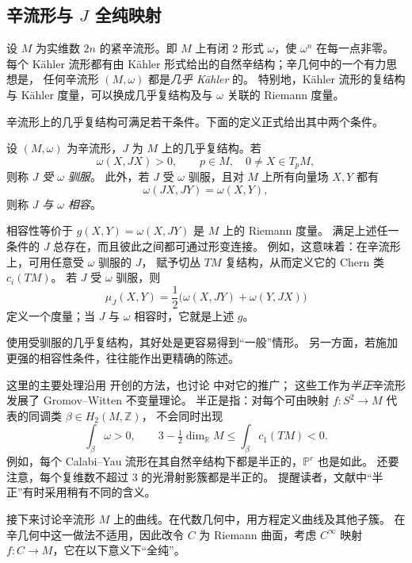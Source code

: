 \subsection{辛流形与 $J$ 全纯映射}\label{subsec:j-holomorphic-maps}
设 $M$ 为实维数 $2n$ 的紧辛流形。即 $M$ 上有闭 $2$ 形式 $\omega$，使 $\omega^n$ 在每一点非零。
每个 Kähler 流形都有由 Kähler 形式给出的自然辛结构；辛几何中的一个有力思想是，
任何辛流形 $(M,\omega)$ 都是\emph{几乎 Kähler} 的。
特别地，Kähler 流形的复结构与 Kähler 度量，可以换成几乎复结构及与 $\omega$ 关联的 Riemann 度量。

辛流形上的几乎复结构可满足若干条件。下面的定义正式给出其中两个条件。

\begin{definition}\label{def:tamed-compatible-complex-structure}
设 $(M,\omega)$ 为辛流形，$J$ 为 $M$ 上的几乎复结构。若
\[
\omega(X,JX)>0,\qquad
p\in M,\quad0\ne X\in T_pM,
\]
则称 $J$ \emph{受 $\omega$ 驯服}。
此外，若 $J$ 受 $\omega$ 驯服，且对 $M$ 上所有向量场 $X,Y$ 都有
\[
\omega(JX,JY)=\omega(X,Y),
\]
则称 $J$ \emph{与 $\omega$ 相容}。
\end{definition}
相容性等价于 $g(X,Y)=\omega(X,JY)$ 是 $M$ 上的 Riemann 度量。
满足上述任一条件的 $J$ 总存在，而且彼此之间都可通过形变连接。
例如，这意味着：在辛流形上，可用任意受 $\omega$ 驯服的 $J$，
赋予切丛 $TM$ 复结构，从而定义它的 Chern 类 $c_i(TM)$。
若 $J$ 受 $\omega$ 驯服，则
\[
\mu_J(X,Y)=\frac12\bigl(\omega(X,JY)+\omega(Y,JX)\bigr)
\]
定义一个度量；当 $J$ 与 $\omega$ 相容时，它就是上述 $g$。

使用受驯服的几乎复结构，其好处是更容易得到“一般”情形。
另一方面，若施加更强的相容性条件，往往能作出更精确的陈述。

这里的主要处理沿用  开创的方法，也讨论  中对它的推广；
这些工作为\emph{半正}辛流形发展了 Gromov--Witten 不变量理论。
半正是指：对每个可由映射 $f:S^2\to M$ 代表的同调类 $\beta\in H_2(M,\mathbb Z)$，
不会同时出现
\[
\int_\beta\omega>0,\qquad
3-\tfrac12\dim_{\mathbb R}M\leq\int_\beta c_1(TM)<0.
\]
例如，每个 Calabi--Yau 流形在其自然辛结构下都是半正的，$\mathbb P^r$ 也是如此。
还要注意，每个复维数不超过 $3$ 的光滑射影簇都是半正的。
提醒读者，文献中“半正”有时采用稍有不同的含义。

接下来讨论辛流形 $M$ 上的曲线。在代数几何中，用方程定义曲线及其他子簇。
在辛几何中这一做法不适用，因此改令 $C$ 为 Riemann 曲面，考虑
$C^\infty$ 映射 $f:C\to M$，它在以下意义下“全纯”。

